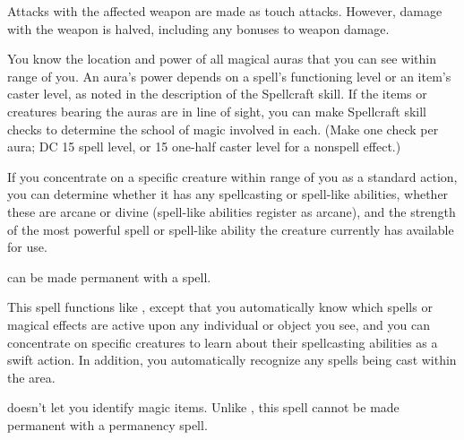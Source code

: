 \spellrng{\rngclose}
\begin{spelleffect}
  Attacks with the affected weapon are made as touch attacks. However, damage with the weapon is halved, including any bonuses to weapon damage.
\end{spelleffect}

\spellrng{\rngpers}
\begin{spelleffect}
  You know the location and power of all magical auras that you can see within \rngmed range of you. An aura's power depends on a spell's functioning level or an item's caster level, as noted in the description of the Spellcraft skill. If the items or creatures bearing the auras are in line of sight, you can make Spellcraft skill checks to determine the school of magic involved in each. (Make one check per aura; DC 15 \add spell level, or 15 \add one-half caster level for a nonspell effect.)
  \par If you concentrate on a specific creature within \rngmed range of you as a standard action, you can determine whether it has any spellcasting or spell-like abilities, whether these are arcane or divine (spell-like abilities register as arcane), and the strength of the most powerful spell or spell-like ability the creature currently has available for use.
\end{spelleffect}
\begin{spellnotes}
   can be made permanent with a  spell.
\end{spellnotes}

\begin{spelleffect}
  This spell functions like , except that you automatically know which spells or magical effects are active upon any individual or object you see, and you can concentrate on specific creatures to learn about their spellcasting abilities as a swift action. In addition, you automatically recognize any spells being cast within the area.
\end{spelleffect}
\begin{spellnotes}
  \par {} doesn't let you identify magic items. Unlike , this spell cannot be made permanent with a permanency spell.
\end{spellnotes}

